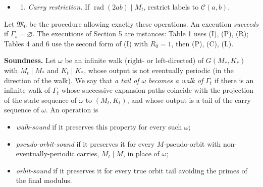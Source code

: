 \documentclass[11pt,reqno]{amsart}
\theoremstyle{definition}
\theoremstyle{remark}
\providecommand{\tightlist}{\setlength{\itemsep}{0pt}\setlength{\parskip}{0pt}}
\begin{document}
\begin{itemize}
\begin{enumerate}
  \def\labelenumi{(\Alph{enumi})}
  \setcounter{enumi}{11}
  \tightlist
  \item
    \emph{Modulus enlargement.} \(M_{t+1}=hM_t\); each edge is replaced by
    all sequences of residues modulo \(M_{t+1}\) along its expansion path
    that are units and satisfy (E2) at every step (all solutions, with no
    inverse of \(b\) assumed). Lifting by a prime \(p\nmid ab\)
    (Section 4.4) is the case \(h=p\), and in the second form of (I) the
    new primes do not divide \(2ab\).
  \end{enumerate}
\item
  \begin{enumerate}
  \def\labelenumi{(\Alph{enumi})}
  \tightlist
  \item
    \emph{Carry restriction.} If \(\operatorname{rad}(2ab)\mid M_t\),
    restrict labels to \(\mathcal C(a,b)\).
  \end{enumerate}
\end{itemize}

Let \(\mathfrak M_0\) be the procedure allowing exactly these operations.
An execution \emph{succeeds} if \(\Gamma_s=\varnothing\). The executions of
Section 5 are instances: Table 1 uses (I), (P), (R); Tables 4 and 6 use
the second form of (I) with \(R_0=1\), then (P), (C), (L).

\textbf{Soundness.} Let \(\omega\) be an infinite walk (right- or
left-directed) of \(G(M_*,K_*)\) with \(M_t\mid M_*\) and
\(K_t\mid K_*\), whose output is not eventually periodic (in the
direction of the walk). We say that \emph{a tail of \(\omega\) becomes a walk
of \(\Gamma_t\)} if there is an infinite walk of \(\Gamma_t\) whose
successive expansion paths coincide with the projection of the state
sequence of \(\omega\) to \((M_t,K_t)\), and whose output is a tail of
the carry sequence of \(\omega\). An operation is

\begin{itemize}
\tightlist
\item
  \emph{walk-sound} if it preserves this property for every such \(\omega\);
\item
  \emph{pseudo-orbit-sound} if it preserves it for every \(M\)-pseudo-orbit
  with non-eventually-periodic carries, \(M_t\mid M\), in place of
  \(\omega\);
\item
  \emph{orbit-sound} if it preserves it for every true orbit tail avoiding the
  primes of the final modulus.
\end{itemize}
\end{document}
